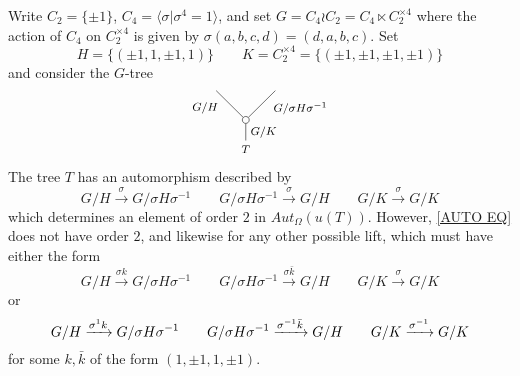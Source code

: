 \documentclass[a4paper,10pt]{article}%
\begin{document}
\begin{example}
Write 
$C_2 = \{\pm 1\}$,
$C_4 = \langle \sigma | \sigma^4 = 1\rangle$,
and set
$G = C_4 \wr C_2
= C_4 \ltimes C_2^{\times 4}$
where the action of 
$C_4$ on $C_2^{\times 4}$
is given by
$\sigma (a,b,c,d) = (d,a,b,c)$.
Set
\[
H = \{(\pm 1, 1 ,\pm 1, 1)\}
\qquad
K = C_2^{\times 4} = \{(\pm 1, \pm 1 ,\pm 1, \pm 1)\}
\]
and consider the $G$-tree
\[
\begin{tikzpicture}[grow=up,auto,level distance=2.1em,every node/.style = {font=\footnotesize},dummy/.style={circle,draw,inner sep=0pt,minimum size=1.75mm}]
\node at (-2,-1) {$T$}
child{node [dummy] {}
	child{
		edge from parent node [swap,near end] {$G/ \sigma H\sigma^{-1}$}}
	child{
		edge from parent node[near end] {$G/H$}}
	edge from parent node [swap] {$G/K$}};
\end{tikzpicture}
\]
The tree $T$ has an automorphism
described by
\begin{equation}\label{AUTO EQ}
	G/H \xrightarrow{\sigma} G/ \sigma H\sigma^{-1}
\qquad
	G/ \sigma H\sigma^{-1} \xrightarrow{\sigma} G/H
\qquad
	G/K \xrightarrow{\sigma} G/K 
\end{equation}
which determines an element of order $2$ in 
$Aut_{\Omega}(u(T))$.
However,  
\eqref{AUTO EQ}
does not have order $2$, 
and likewise for any other possible lift, 
which must have either the form
\begin{equation}
G/H \xrightarrow{\sigma k } G/ \sigma H\sigma^{-1}
\qquad
G/ \sigma H\sigma^{-1} \xrightarrow{\sigma \bar{k}} G/H
\qquad
G/K \xrightarrow{\sigma} G/K 
\end{equation}
or
\begin{equation}
G/H \xrightarrow{\sigma^{\-1} k } G/ \sigma H\sigma^{-1}
\qquad
G/ \sigma H\sigma^{-1} \xrightarrow{\sigma^{-1} \bar{k}} G/H
\qquad
G/K \xrightarrow{\sigma^{-1}} G/K 
\end{equation}
for some $k,\bar{k}$ of the form $(1,\pm 1, 1, \pm 1)$.
\end{example}	














\newpage

{}




\end{document}
